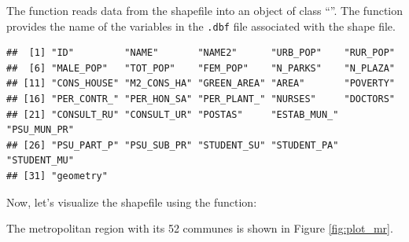 The  function reads data from the shapefile into an object of class ``''. The  function provides the name of the variables in the \texttt{.dbf} file associated with the shape file. 
\begin{knitrout}
\color{fgcolor}\begin{kframe}
\begin{alltt}
\end{alltt}
\begin{verbatim}
##  [1] "ID"         "NAME"       "NAME2"      "URB_POP"    "RUR_POP"   
##  [6] "MALE_POP"   "TOT_POP"    "FEM_POP"    "N_PARKS"    "N_PLAZA"   
## [11] "CONS_HOUSE" "M2_CONS_HA" "GREEN_AREA" "AREA"       "POVERTY"   
## [16] "PER_CONTR_" "PER_HON_SA" "PER_PLANT_" "NURSES"     "DOCTORS"   
## [21] "CONSULT_RU" "CONSULT_UR" "POSTAS"     "ESTAB_MUN_" "PSU_MUN_PR"
## [26] "PSU_PART_P" "PSU_SUB_PR" "STUDENT_SU" "STUDENT_PA" "STUDENT_MU"
## [31] "geometry"
\end{verbatim}
\end{kframe}
\end{knitrout}

Now, let's visualize the shapefile using the  function:
\begin{knitrout}
\color{fgcolor}\begin{kframe}
\begin{alltt}
\hldef{(}  \hldef{=} \hldef{,}  \hldef{=} \hldef{)}
\end{alltt}
\end{kframe}
\end{knitrout}

The metropolitan region with its 52 communes is shown in Figure \ref{fig:plot_mr}.

